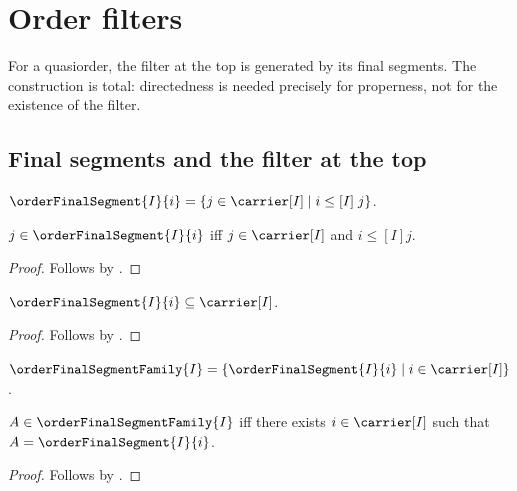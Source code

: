 \section{Order filters}





For a quasiorder, the filter at the top is generated by its final segments.
The construction is total: directedness is needed precisely for properness,
not for the existence of the filter.

\subsection{Final segments and the filter at the top}

\begin{definition}\label{order_final_segment}
    $\orderFinalSegment{I}{i}
        =\{j\in\carrier[I]\mid i\mathrel{\leq[I]}j\}$.
\end{definition}

\begin{proposition}\label{order_final_segment_iff}
    $j\in\orderFinalSegment{I}{i}$ iff
        $j\in\carrier[I]$ and $i\mathrel{\leq[I]}j$.
\end{proposition}
\begin{proof}
    Follows by .
\end{proof}

\begin{proposition}\label{order_final_segment_type}
    $\orderFinalSegment{I}{i}\subseteq\carrier[I]$.
\end{proposition}
\begin{proof}
    Follows by .
\end{proof}

\begin{definition}\label{order_final_segment_family}
    $\orderFinalSegmentFamily{I}
        =\{\orderFinalSegment{I}{i}\mid i\in\carrier[I]\}$.
\end{definition}

\begin{proposition}\label{order_final_segment_family_iff}
    $A\in\orderFinalSegmentFamily{I}$ iff there exists
        $i\in\carrier[I]$ such that
        $A=\orderFinalSegment{I}{i}$.
\end{proposition}
\begin{proof}
    Follows by .
\end{proof}

